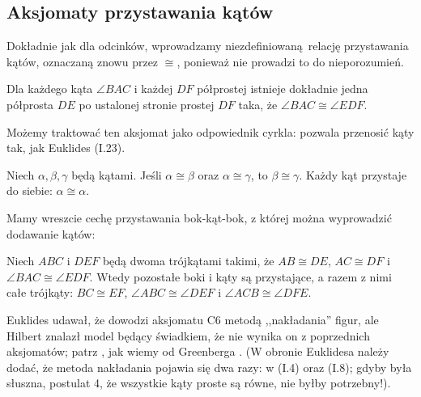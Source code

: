 \subsection{Aksjomaty przystawania kątów}
Dokładnie jak dla odcinków, wprowadzamy niezdefiniowaną relację przystawania kątów, oznaczaną znowu przez $\cong$, ponieważ nie prowadzi to do nieporozumień.

\begin{axiom}[przystawania, C4]
    Dla każdego kąta $\angle BAC$ i każdej $DF$ półprostej istnieje dokładnie jedna półprosta $DE$ po ustalonej stronie prostej $DF$ taka, że $\angle BAC \cong \angle EDF$.
\end{axiom}

Możemy traktować ten aksjomat jako odpowiednik cyrkla: pozwala przenosić kąty tak, jak Euklides (I.23).

\begin{axiom}[przystawania, C5]
    Niech $\alpha, \beta, \gamma$ będą kątami.
    Jeśli $\alpha \cong \beta$ oraz $\alpha \cong \gamma$, to $\beta \cong \gamma$.
    Każdy kąt przystaje do siebie: $\alpha \cong \alpha$.
\end{axiom}

Mamy wreszcie cechę przystawania bok-kąt-bok, z której można wyprowadzić dodawanie kątów:
%



\begin{axiom}[przystawania, C6]
    Niech $ABC$ i $DEF$ będą dwoma trójkątami takimi, że $AB \cong DE$, $AC \cong DF$ i $\angle BAC \cong \angle EDF$.
    Wtedy pozostałe boki i kąty są przystające, a razem z nimi całe trójkąty: $BC \cong EF$, $\angle ABC \cong \angle DEF$ i $\angle ACB \cong \angle DFE$.
\end{axiom}

Euklides udawał, że dowodzi aksjomatu C6 metodą ,,nakładania'' figur, ale Hilbert znalazł model będący świadkiem, że nie wynika on z poprzednich aksjomatów; patrz \cite[paragraf 11]{hilbert_1988}, jak wiemy od Greenberga \cite[s. 200]{greenberg_2010}.
(W obronie Euklidesa należy dodać, że metoda nakładania pojawia się dwa razy: w (I.4) oraz (I.8); gdyby była słuszna, postulat 4, że wszystkie kąty proste są równe, nie byłby potrzebny!).
%

